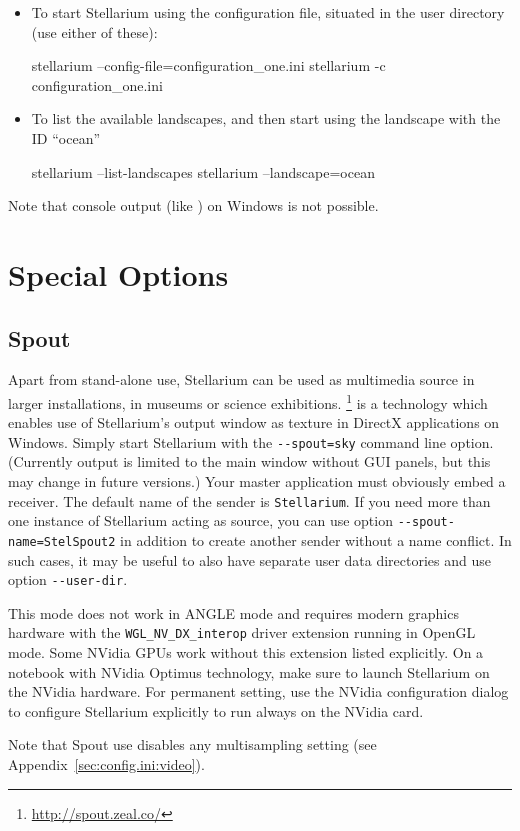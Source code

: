 \begin{itemize}
\item To start Stellarium using the configuration file,
   situated in the user directory (use either of
  these):

\begin{commands}
stellarium --config-file=configuration_one.ini
stellarium -c configuration_one.ini
\end{commands}

\item To list the available landscapes, and then start using the
  landscape with the ID ``ocean''
\begin{commands}
stellarium --list-landscapes 
stellarium --landscape=ocean
\end{commands}
\end{itemize}

\noindent Note that console output (like ) on Windows is not possible. 

\section{Special Options}
\label{sec:CommandLineOptions:Special}
\subsection{Spout} 
\label{sec:CommandLineOptions:Special:Spout}
Apart from stand-alone use, Stellarium can be used as multimedia source in larger installations, in museums or science exhibitions. 
\footnote{\url{http://spout.zeal.co/}} is a technology which enables use of Stellarium's 
output window as texture in DirectX applications on Windows. Simply start Stellarium with 
the \texttt{-\/-spout=sky} command line option. (Currently  output is limited to the main window 
without GUI panels, but this may change in future versions.) 
Your master application must obviously embed a  receiver. 
The default name of the  sender is \texttt{Stellarium}. If you need more than one instance of Stellarium acting as source, 
you can use option \texttt{-\/-spout-name=StelSpout2} in addition to create another  sender without a name conflict. 
In such cases, it may be useful to also have separate user data directories and use option \texttt{-\/-user-dir}. 

This mode does not work in ANGLE mode and requires modern graphics hardware with the \texttt{WGL\_NV\_DX\_interop} 
driver extension running in OpenGL mode. Some NVidia GPUs work without this extension listed explicitly. 
On a notebook with NVidia Optimus technology, make sure to launch Stellarium on the NVidia hardware. 
For permanent setting, use the NVidia configuration dialog to configure Stellarium explicitly to run always on the NVidia card.

Note that Spout use disables any multisampling setting (see Appendix~\ref{sec:config.ini:video}). 


